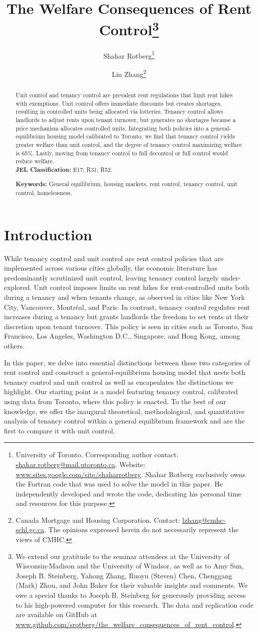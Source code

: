 \documentclass[parskip=full]{article}
\title{\vspace{-1.8cm}The Welfare Consequences of Rent Control\footnote{We extend our gratitude to the seminar attendees at the University of Wisconsin-Madison and the University of Windsor, as well as to Amy Sun, Joseph B. Steinberg, Yahong Zhang, Ruoyu (Steven) Chen, Chenggang (Mark) Zhou, and John Baker for their valuable insights and comments. We owe a special thanks to Joseph B. Steinberg for generously providing access to his high-powered computer for this research. The data and replication code are available on GitHub at \url{www.github.com/srotberg/the_welfare_consequences_of_rent_control}.}}
\author{Shahar Rotberg\footnote{University of Toronto. Corresponding author contact: \url{shahar.rotberg@mail.utoronto.ca}. Website: \url{www.sites.google.com/site/shaharrotberg}. Shahar Rotberg exclusively owns the Fortran code that was used to solve the model in this paper. He independently developed and wrote the code, dedicating his personal time and resources for this purpose.} \and Lin Zhang\footnote{Canada Mortgage and Housing Corporation. Contact: \url{lzhang@cmhc-schl.gc.ca}. The opinions expressed herein do not necessarily represent the views of CMHC.}}
\begin{document}
\maketitle

\begin{abstract}
\onehalfspacing
\noindent

\noindent Unit control and tenancy control are prevalent rent regulations that limit rent hikes with exemptions. Unit control offers immediate discounts but creates shortages, resulting in controlled units being allocated via lotteries. Tenancy control allows landlords to adjust rents upon tenant turnover, but generates no shortages because a price mechanism allocates controlled units. Integrating both policies into a general-equilibrium housing model calibrated to Toronto, we find that tenancy control yields greater welfare than unit control, and the degree of tenancy control maximizing welfare is 65\%. Lastly, moving from tenancy control to full decontrol or full control would reduce welfare.
\\[1.5ex]

\noindent \textbf{JEL Classification:} E17; R31; R52. 

\noindent \textbf{Keywords:} General equilibrium, housing markets, rent control, tenancy control, unit control, homelessness.
\end{abstract}

\section{Introduction}

While tenancy control and unit control are rent control policies that are implemented across various cities globally, the economic literature has predominantly scrutinized unit control, leaving tenancy control largely under-explored. Unit control imposes limits on rent hikes for rent-controlled units both during a tenancy and when tenants change, as observed in cities like New York City, Vancouver, Montréal, and Paris. In contrast, tenancy control regulates rent increases during a tenancy but grants landlords the freedom to set rents at their discretion upon tenant turnover. This policy is seen in cities such as Toronto, San Francisco, Los Angeles, Washington D.C., Singapore, and Hong Kong, among others.

In this paper, we delve into essential distinctions between these two categories of rent control and construct a general-equilibrium housing model that nests both tenancy control and unit control as well as encapsulates the distinctions we highlight. Our starting point is a model featuring tenancy control, calibrated using data from Toronto, where this policy is enacted. To the best of our knowledge, we offer the inaugural theoretical, methodological, and quantitative analysis of tenancy control within a general equilibrium framework and are the first to compare it with unit control.
\end{document}

